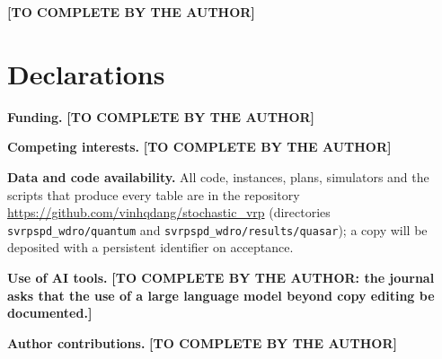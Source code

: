 \documentclass[pdflatex,sn-mathphys-num]{sn-jnl}
\theoremstyle{thmstyleone}
\theoremstyle{thmstyletwo}
\begin{document}
\backmatter

\textbf{[TO COMPLETE BY THE AUTHOR]}

\section*{Declarations}
\textbf{Funding.} \textbf{[TO COMPLETE BY THE AUTHOR]}

\textbf{Competing interests.} \textbf{[TO COMPLETE BY THE AUTHOR]}

\textbf{Data and code availability.} All code, instances, plans, simulators and the scripts that produce every table are in the repository \url{https://github.com/vinhqdang/stochastic_vrp} (directories \texttt{svrpspd\_wdro/quantum} and \texttt{svrpspd\_wdro/results/quasar}); a copy will be deposited with a persistent identifier on acceptance.

\textbf{Use of AI tools.} \textbf{[TO COMPLETE BY THE AUTHOR: the journal asks that the use of a large language model beyond copy editing be documented.]}

\textbf{Author contributions.} \textbf{[TO COMPLETE BY THE AUTHOR]}

\begin{appendices}

\end{appendices}


\end{document}
